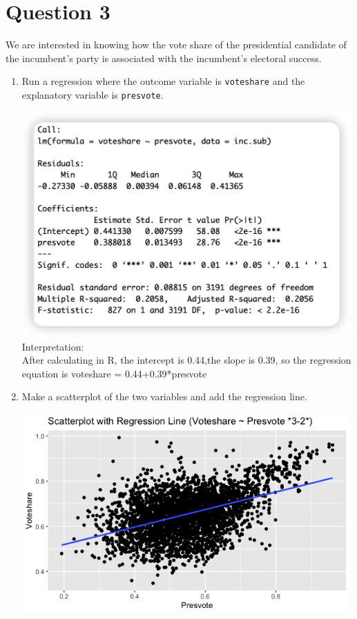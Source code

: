 \documentclass[12pt,letterpaper]{article}
\begin{document}
	\newpage	
\section*{Question 3}

\noindent We are interested in knowing how the vote share of the presidential candidate of the incumbent's party is associated with the incumbent's electoral success.
	\vspace{.25cm}
	\begin{enumerate}
		\item Run a regression where the outcome variable is \texttt{voteshare} and the explanatory variable is \texttt{presvote}.
		\vspace{1cm}			
		
		\vspace{1cm}
		\includegraphics[width=0.99\textwidth]{3_1.png}	
		\vspace{1cm}
		\noindent
		Interpretation:\\
		After calculating in R, the intercept is 0.44,the slope is 0.39, so the regression equation is voteshare = 0.44+0.39*presvote
		\item Make a scatterplot of the two variables and add the regression line. 
		\vspace{1cm}
		
		\vspace{1cm}
		\includegraphics[width=0.99\textwidth]{3_2.png}	

\end{enumerate}
\end{document}
